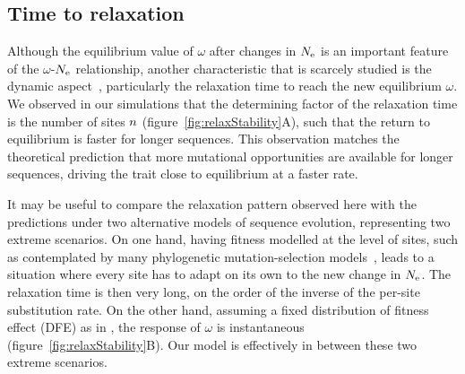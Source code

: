 \subsection{Time to relaxation}

Although the equilibrium value of $\omega$ after changes in $N_{\text{e}}$ is an important feature of the $\omega$-$N_{\text{e}}$ relationship, another characteristic that is scarcely studied is the dynamic aspect~\citep{Jones2016}, particularly the relaxation time to reach the new equilibrium $\omega$.
We observed in our simulations that the determining factor of the relaxation time is the number of sites $n$ (figure~\ref{fig:relaxStability}A), such that the return to equilibrium is faster for longer sequences.
This observation matches the theoretical prediction that more mutational opportunities are available for longer sequences, driving the trait close to equilibrium at a faster rate.

It may be useful to compare the relaxation pattern observed here with the predictions under two alternative models of sequence evolution, representing two extreme scenarios.
On one hand, having fitness modelled at the level of sites, such as contemplated by many phylogenetic mutation-selection models~\citep{Halpern1998, Rodrigue2010, Tamuri2012}, leads to a situation where every site has to adapt on its own to the new change in $N_{\text{e}}$.
The relaxation time is then very long, on the order of the inverse of the per-site \gls{substitution} rate.
On the other hand, assuming a fixed distribution of fitness effect (\acrshort{DFE}) as in \citet{Welch2008}, the response of $\omega$ is instantaneous (figure~\ref{fig:relaxStability}B).
Our model is effectively in between these two extreme scenarios.

